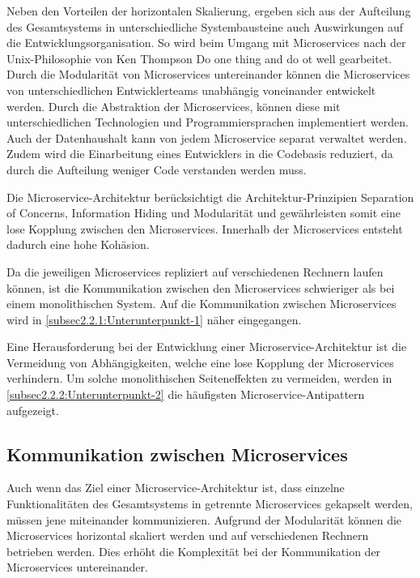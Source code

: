 Neben den Vorteilen der horizontalen Skalierung, ergeben sich aus der Aufteilung des Gesamtsystems in unterschiedliche Systembausteine auch Auswirkungen auf die Entwicklungsorganisation. So wird beim Umgang mit Microservices nach der Unix-Philosophie von Ken Thompson \glqq Do one thing and do ot well\grqq{} \cite{IONOSSE.2021} gearbeitet. Durch die Modularität von Microservices untereinander können die Microservices von unterschiedlichen Entwicklerteams unabhängig voneinander entwickelt werden. Durch die Abstraktion der Microservices, können diese mit unterschiedlichen Technologien und Programmiersprachen implementiert werden. Auch der Datenhaushalt kann von jedem Microservice separat verwaltet werden. Zudem wird die Einarbeitung eines Entwicklers in die Codebasis reduziert, da durch die Aufteilung weniger Code verstanden werden muss.

Die Microservice-Architektur berücksichtigt die Architektur-Prinzipien Separation of Concerns, Information Hiding und Modularität und gewährleisten somit eine lose Kopplung zwischen den Microservices. Innerhalb der Microservices entsteht dadurch eine hohe Kohäsion.

Da die jeweiligen Microservices repliziert auf verschiedenen Rechnern laufen können, ist die Kommunikation zwischen den Microservices schwieriger als bei einem monolithischen System. Auf die Kommunikation zwischen Microservices wird in \autoref{subsec2.2.1:Unterunterpunkt-1} näher eingegangen.

Eine Herausforderung bei der Entwicklung einer Microservice-Architektur ist die Vermeidung von Abhängigkeiten, welche eine lose Kopplung der Microservices verhindern. Um solche monolithischen Seiteneffekten zu vermeiden, werden in \autoref{subsec2.2.2:Unterunterpunkt-2} die häufigsten Microservice-Antipattern aufgezeigt.

\subsection{Kommunikation zwischen Microservices\label{subsec2.2.1:Unterunterpunkt-1}}

Auch wenn das Ziel einer Microservice-Architektur ist, dass einzelne Funktionalitäten des Gesamtsystems in getrennte Microservices gekapselt werden, müssen jene miteinander kommunizieren. Aufgrund der Modularität können die Microservices horizontal skaliert werden und auf verschiedenen Rechnern betrieben werden. Dies erhöht die Komplexität bei der Kommunikation der Microservices untereinander. \cite{MichaelSchwab.2019}

